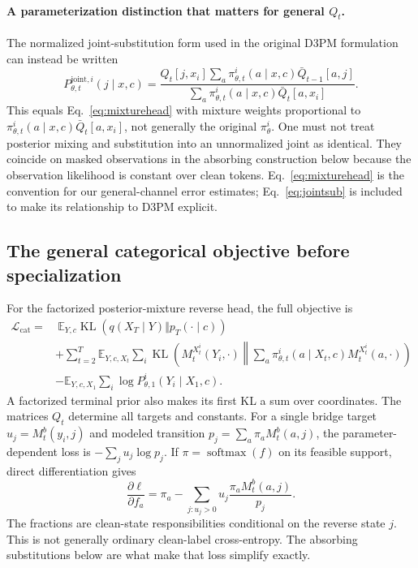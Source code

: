 \documentclass{article}
\theoremstyle{remark}\newtheorem{remark}[theorem]{Remark}
\newcommand{\E}{\mathbb E}
\newcommand{\KL}{\operatorname{KL}}
\begin{document}
\paragraph{A parameterization distinction that matters for general $Q_t$.}
The normalized joint-substitution form used in the original D3PM formulation can instead be written
\begin{equation}
 P_{\theta,t}^{\mathrm{joint},i}(j\mid x,c)=
 \frac{Q_t[j,x_i]\sum_a\pi_{\theta,t}^i(a\mid x,c)\bar Q_{t-1}[a,j]}
 {\sum_a\pi_{\theta,t}^i(a\mid x,c)\bar Q_t[a,x_i]}.
 \label{eq:jointsub}
\end{equation}
This equals Eq.~\eqref{eq:mixturehead} with mixture weights proportional to
$\pi_{\theta,t}^i(a\mid x,c)\bar Q_t[a,x_i]$, not generally the original $\pi_\theta^i$.
One must not treat posterior mixing and substitution into an unnormalized joint as identical. They coincide on masked observations in the absorbing construction below because the observation likelihood is constant over clean tokens. Eq.~\eqref{eq:mixturehead} is the convention for our general-channel error estimates; Eq.~\eqref{eq:jointsub} is included to make its relationship to D3PM explicit.

\subsection{The general categorical objective before specialization}
For the factorized posterior-mixture reverse head, the full objective is
\begin{align}
 \mathcal L_{\mathrm{cat}}=&\ \E_{Y,c}\KL(q(X_T\mid Y)\Vert p_T(\cdot\mid c))\nonumber\\
 &+\sum_{t=2}^T\E_{Y,c,X_t}\sum_i
 \KL\left(M_t^{X_t^i}(Y_i,\cdot)\middle\Vert
 \sum_a\pi_{\theta,t}^i(a\mid X_t,c)M_t^{X_t^i}(a,\cdot)\right)\nonumber\\
 &-\E_{Y,c,X_1}\sum_i\log P_{\theta,1}^i(Y_i\mid X_1,c).
 \label{eq:generalcatloss}
\end{align}
A factorized terminal prior also makes its first KL a sum over coordinates. The matrices $Q_t$ determine all targets and constants. For a single bridge target $u_j=M_t^b(y_i,j)$ and modeled transition $p_j=\sum_a\pi_aM_t^b(a,j)$, the parameter-dependent loss is $-\sum_j u_j\log p_j$. If $\pi=\operatorname{softmax}(f)$ on its feasible support, direct differentiation gives
\begin{equation}
 \frac{\partial\ell}{\partial f_a}=\pi_a-
 \sum_{j:u_j>0}u_j\frac{\pi_aM_t^b(a,j)}{p_j}.
 \label{eq:generalcatgradient}
\end{equation}
The fractions are clean-state responsibilities conditional on the reverse state $j$. This is not generally ordinary clean-label cross-entropy. The absorbing substitutions below are what make that loss simplify exactly.
\end{document}
